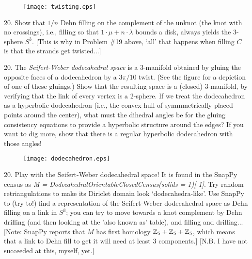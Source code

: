 \documentclass[12pt]{article}
\begin{document}
\begin{description}
\begin{figure}[h]
\begin{center}
\texttt{[image: twisting.eps]}
\end{center}
\end{figure} 

\item{20.} Show that $1/n$ Dehn filling on the complement of the unknot (the knot with no crossings),
i.e., filling so that $1\cdot\mu+n\cdot\lambda$ bounds a disk, always yields the 3-sphere $S^3$.
[This is why in Problem \#19 above, `all' that happens when filling $C$ is that the strands get twisted...]

\item{20.}  The {\it Seifert-Weber dodecahedral space} is a 3-manifold obtained by gluing the
opposite faces of a dodecahedron by a $3\pi/10$ twist. (See the figure for a depiction of one of these
gluings.) Show that the resulting space is a (closed) 3-manifold, by verifying that the link of 
every vertex is a 2-sphere. If we treat the dodecahedron as a  hyperbolic dodecahedron
(i.e., the convex hull of symmmetrically placed points around the center), what must the dihedral 
angles be for the gluing consistency equations to provide a hyperbolic structure around the edges?
If you want to dig more, show that there is a regular hyperbolic dodecahedron with those angles!

\begin{figure}[h]
\begin{center}
\texttt{[image: dodecahedron.eps]}
\end{center}
\end{figure} 

\item{20.} Play with the Seifert-Weber dodecahedral space!
It is found in the SnapPy census as 
{\it M = DodecahedralOrientableClosedCensus(solids = 1)[-1]}. Try random retriangulations
to make its Diriclet domain look `dodecahedra-like'.
Use SnapPy to (try to!) find a representation of the Seifert-Weber dodecahedral space as 
Dehn filling on a link in $S^3$; you can try to move towards
a knot complement by Dehn drilling (and then looking at the 'also known as' table),
and filling and drilling...
[Note: SnapPy reports that $M$ has first homology ${\mathbb Z}_5+{\mathbb Z}_5+{\mathbb Z}_5$, which means that a link to 
Dehn fill to get it will need at least 3 components.] [N.B. I have not succeeded at this, myself, yet.]


\end{description}
\end{document}
